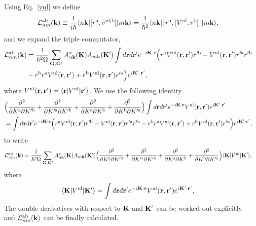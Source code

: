 \documentclass[floatfix,prb,aps,superscriptaddress,11pt,preprint,letterpaper]{revtex4}
\def\chon{red}
\begin{document}
\label{calt}
Using Eq.~\eqref{vnl} we define
\begin{align}\label{3.1}
{\cal L}^{\mathrm{a}\mathrm{b}}_{nm}(\mathbf{k}) 
\equiv\frac{1}{i\hbar}
\langle n\mathbf{k} |
[ r^{\mathrm{a}}, v^{\mathrm{nl},\mathrm{b}}]
| m\mathbf{k} \rangle
=
\frac{1}{\hbar^2}
\langle n\mathbf{k} |
\big[ r^{\mathrm{a}},[ V^{\mathrm{nl}}, r^{\mathrm{b}}]\big]
| m\mathbf{k} \rangle
,
\end{align} 
{\color{\chon} and we expand the triple commutator,}
\begin{align}\label{3.5}
{\cal L}^{\mathrm{a}\mathrm{b}}_{nm}(\mathbf{k}) 
&=
\frac{1}{\hbar^2\Omega}
\sum_{\mathbf{G},\mathbf{G}'} 
A^*_{n\mathbf{k}}(\mathbf{K}) 
A_{m\mathbf{k}}(\mathbf{K}')
\int
d\mathbf{r} d\mathbf{r}'
 e^{-i\mathbf{K}\cdot\mathbf{r}}
\Big(
r^{\mathrm{a}}
V^{\mathrm{nl}}(\mathbf{r},\mathbf{r}')
r'^{\mathrm{b}}
-
V^{\mathrm{nl}}(\mathbf{r},\mathbf{r}')
r'^{\mathrm{a}}
r'^{\mathrm{b}}
\nonumber\\
&-
r^{\mathrm{b}}
r^{\mathrm{a}}
V^{\mathrm{nl}}(\mathbf{r},\mathbf{r}')
+
 r^{\mathrm{b}}
V^{\mathrm{nl}}(\mathbf{r},\mathbf{r}')
r'^{\mathrm{a}}
\Big) 
 e^{i\mathbf{K}'\cdot\mathbf{r}'}
,
\end{align} 
where 
$V^{\mathrm{nl}}(\mathbf{r},\mathbf{r}') = \langle \mathbf{r} | V^{\mathrm{nl}}| \mathbf{r}' \rangle$.
We use the following identity
\begin{align}\label{3.4}
&
\Big(
\frac{\partial^2}{\partial K^{\mathrm{a}}\partial K'^{\mathrm{b}}}
+
\frac{\partial^2}{\partial K'^{\mathrm{a}}\partial K'^{\mathrm{b}}}
+
\frac{\partial^2}{\partial K^{\mathrm{a}}\partial K^{\mathrm{b}}}
+
\frac{\partial^2}{\partial K^{\mathrm{b}}\partial K'^{\mathrm{a}}}
\Big)
\int 
d\mathbf{r} d\mathbf{r}' 
 e^{-i\mathbf{K}\cdot\mathbf{r}}
V^{\mathrm{nl}}(\mathbf{r},\mathbf{r}') 
e^{i\mathbf{K}'\cdot\mathbf{r}'}
\nonumber\\
&=
\int d\mathbf{r} d\mathbf{r}'
 e^{-i\mathbf{K}\cdot\mathbf{r}}
\Big( 
r^{\mathrm{a}} 
V^{\mathrm{nl}}(\mathbf{r},\mathbf{r}') 
r'^{\mathrm{b}}
- 
V^{\mathrm{nl}}(\mathbf{r},\mathbf{r}') 
r'^{\mathrm{a}} 
r'^{\mathrm{b}}
- 
r^{\mathrm{b}} 
r^{\mathrm{a}} 
V^{\mathrm{nl}}(\mathbf{r},\mathbf{r}')
+
 r^{\mathrm{b}} 
V^{\mathrm{nl}}(\mathbf{r},\mathbf{r}') 
r'^{\mathrm{a}}
\Big)  
e^{i\mathbf{K}'\cdot\mathbf{r}'}
,
\end{align}
to write
\begin{align}\label{3.7}
{\cal L}^{\mathrm{a}\mathrm{b}}_{nm}(\mathbf{k})
&=
\frac{1}{\hbar^2\Omega}
\sum_{\mathbf{G},\mathbf{G}'} 
A^*_{n\mathbf{k}}(\mathbf{K}) 
A_{m\mathbf{k}}(\mathbf{K}')
\Big(
\frac{\partial^2}{\partial K^{\mathrm{a}}\partial K'^{\mathrm{b}}}
+
\frac{\partial^2}{\partial K'^{\mathrm{a}}\partial K'^{\mathrm{b}}}
+
\frac{\partial^2}{\partial K^{\mathrm{a}}\partial K^{\mathrm{b}}}
+
\frac{\partial^2}{\partial K^{\mathrm{b}}\partial K'^{\mathrm{a}}}
\Big)
\langle \mathbf{K} | 
V^{\mathrm{nl}} 
| \mathbf{K}' \rangle, 
\nonumber\\
\end{align} 
where
\begin{align}\label{vkk}
\langle \mathbf{K} | 
V^{\mathrm{nl}} 
| \mathbf{K}' \rangle 
=
\int 
d\mathbf{r} d\mathbf{r}' 
 e^{-i\mathbf{K}\cdot\mathbf{r}}
V^{\mathrm{nl}}(\mathbf{r},\mathbf{r}') 
e^{i\mathbf{K}'\cdot\mathbf{r}'}
,
\end{align}
The double derivatives with respect to $\mathbf{K}$ and $\mathbf{K}'$ 
can be worked out explicitly {\color{\chon} and} 
${\cal L}^{\mathrm{a}\mathrm{b}}_{nm}(\mathbf{k})$
{\color{\chon} can} be finally calculated.\cite{valerie}
\end{document}
